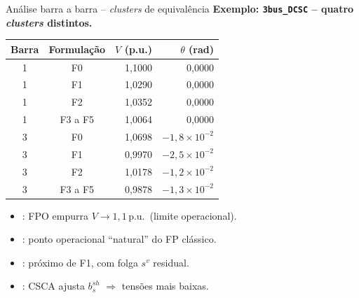 \documentclass{libs/ufc_format}
\begin{document}
\begin{frame}{Análise barra a barra -- \textit{clusters} de equivalência}
    \textbf{Exemplo: \texttt{3bus\_DCSC} -- quatro \textit{clusters} distintos.}
    \begin{center}
    \footnotesize
    \begin{tabular}{ccrr}
        \hline
        \textbf{Barra} & \textbf{Formulação} & $V$ (p.u.) & $\theta$ (rad) \\
        \hline
        1 & F0      & 1{,}1000 & 0{,}0000 \\
        1 & F1      & 1{,}0290 & 0{,}0000 \\
        1 & F2      & 1{,}0352 & 0{,}0000 \\
        1 & F3 a F5 & 1{,}0064 & 0{,}0000 \\
        \hline
        3 & F0      & 1{,}0698 & $-1{,}8 \times 10^{-2}$ \\
        3 & F1      & 0{,}9970 & $-2{,}5 \times 10^{-2}$ \\
        3 & F2      & 1{,}0178 & $-1{,}2 \times 10^{-2}$ \\
        3 & F3 a F5 & 0{,}9878 & $-1{,}3 \times 10^{-2}$ \\
        \hline
    \end{tabular}
    \end{center}

    \vspace{0.2cm}
    \begin{itemize}
        \item {}: FPO empurra $V \to 1{,}1$\,p.u.\ (limite operacional).
        \item {}: ponto operacional ``natural'' do FP clássico.
        \item {}: próximo de F1, com folga $s^v$ residual.
        \item {}: CSCA ajusta $b^{sh}_s$ $\Rightarrow$ tensões mais baixas.
    \end{itemize}
\end{frame}
\end{document}
